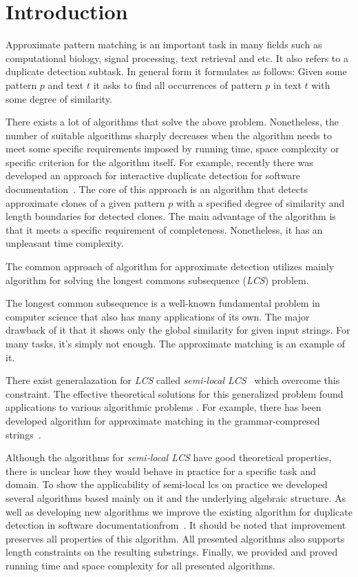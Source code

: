 \section{Introduction}
Approximate pattern matching is an important task in many fields such as computational biology, signal processing, text retrieval and etc.
It also refers to a duplicate detection subtask.
In general form it formulates as follows: Given some pattern $p$ and text $t$ it asks to find all occurrences of pattern $p$ in text $t$ with some degree of similarity.

There exists a lot of algorithms that solve the above problem.
Nonetheless, the number of suitable algorithms sharply decreases when the algorithm needs to meet some specific requirements imposed by running time, space complexity or specific criterion for the algorithm itself.
For example, recently there was developed an approach for interactive duplicate detection for software documentation~\cite{luciv2019interactive}.
The core of this approach is an algorithm that detects approximate clones of a given pattern $p$ with a specified degree of similarity and length boundaries for detected clones.
The main advantage of the algorithm is that it meets a specific requirement of completeness.
Nonetheless, it has an unpleasant time complexity.



   
The common approach of algorithm for approximate detection utilizes mainly algorithm for solving the longest commons subsequence (\emph{LCS}) problem.

The longest common subsequence is a well-known fundamental problem in computer science that also has many applications of its own.
The major drawback of it that it shows only the global similarity for given input strings.
For many tasks, it's simply not enough.
The approximate matching is an example of it.

There exist generalazation for \emph{LCS} called \emph{semi-local LCS}~\cite{} which overcome this constraint. 
The effective theoretical solutions for this generalized problem found applications to various algorithmic problems .
For example, there has been developed algorithm for approximate matching in the grammar-compresed strings~\cite{.}.

Although the algorithms for \emph{semi-local LCS} have good theoretical properties, there is unclear how they would behave in practice for a specific task and domain.
To show the applicability of semi-local lcs on practice we developed several algorithms based mainly on it and the underlying algebraic structure.
As well as developing new algorithms we improve the existing algorithm for duplicate detection in software documentationfrom~\cite{luciv2019interactive}.
It should be noted that improvement preserves all properties of this algorithm.
All presented algorithms also supports length constraints on the resulting substrings.
Finally, we provided and proved running time and space complexity for all presented algorithms.


